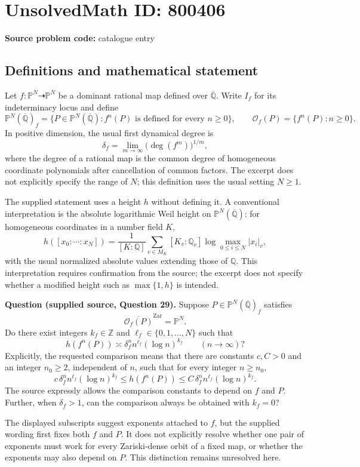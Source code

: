 \documentclass[11pt]{article}
\newcommand{\Z}{\mathbb{Z}}
\newcommand{\Q}{\mathbb{Q}}
\newcommand{\PP}{\mathbb{P}}
\begin{document}
\section*{UnsolvedMath ID: 800406}
\textbf{Source problem code:} catalogue entry
\subsection{Definitions and mathematical statement}
Let \(f:\PP^N\dashrightarrow\PP^N\) be a dominant rational map defined over \(\overline{\Q}\). Write \(I_f\) for its indeterminacy locus and define
\[
\PP^N(\overline{\Q})_f=\{P\in\PP^N(\overline{\Q}): f^n(P)\text{ is defined for every }n\geq 0\},
\qquad
\mathcal O_f(P)=\{f^n(P):n\geq0\}.
\]
In positive dimension, the usual first dynamical degree is
\[
\delta_f=\lim_{m\to\infty}\bigl(\deg(f^m)\bigr)^{1/m},
\]
where the degree of a rational map is the common degree of homogeneous coordinate polynomials after cancellation of common factors. The excerpt does not explicitly specify the range of \(N\); this definition uses the usual setting \(N\geq1\).

The supplied statement uses a height \(h\) without defining it. A conventional interpretation is the absolute logarithmic Weil height on \(\PP^N(\overline{\Q})\): for homogeneous coordinates in a number field \(K\),
\[
h([x_0:\cdots:x_N])=
\frac{1}{[K:\Q]}\sum_{v\in M_K}[K_v:\Q_v]\log\max_{0\leq i\leq N}|x_i|_v,
\]
with the usual normalized absolute values extending those of \(\Q\). This interpretation requires confirmation from the source; the excerpt does not specify whether a modified height such as \(\max\{1,h\}\) is intended.

\textbf{Question (supplied source, Question 29).} Suppose \(P\in\PP^N(\overline{\Q})_f\) satisfies
\[
\overline{\mathcal O_f(P)}^{\mathrm{Zar}}=\PP^N.
\]
Do there exist integers \(k_f\in\Z\) and \(\ell_f\in\{0,1,\ldots,N\}\) such that
\[
h(f^n(P))\asymp \delta_f^n n^{\ell_f}(\log n)^{k_f}
\qquad(n\to\infty)?
\]
Explicitly, the requested comparison means that there are constants \(c,C>0\) and an integer \(n_0\geq2\), independent of \(n\), such that for every integer \(n\geq n_0\),
\[
c\,\delta_f^n n^{\ell_f}(\log n)^{k_f}
\leq h(f^n(P))
\leq C\,\delta_f^n n^{\ell_f}(\log n)^{k_f}.
\]
The source expressly allows the comparison constants to depend on \(f\) and \(P\). Further, when \(\delta_f>1\), can the comparison always be obtained with \(k_f=0\)?

The displayed subscripts suggest exponents attached to \(f\), but the supplied wording first fixes both \(f\) and \(P\). It does not explicitly resolve whether one pair of exponents must work for every Zariski-dense orbit of a fixed map, or whether the exponents may also depend on \(P\). This distinction remains unresolved here.
\end{document}
